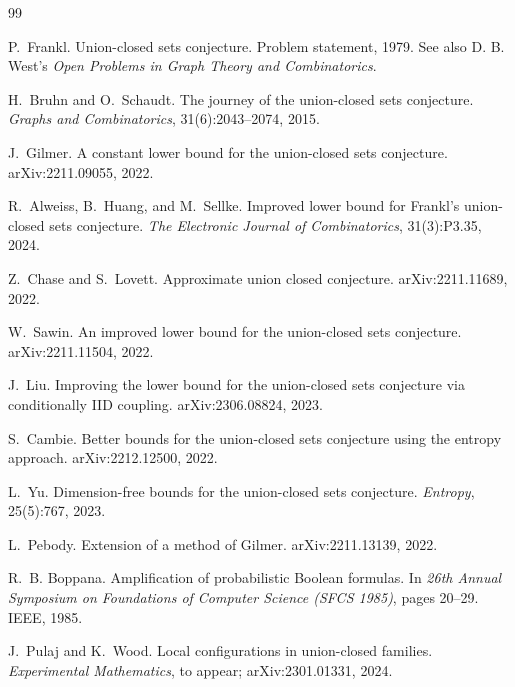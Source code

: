 \begin{thebibliography}{99}

P.~Frankl.
\newblock Union-closed sets conjecture.
\newblock Problem statement, 1979. See also D. B. West's \emph{Open Problems in Graph Theory and Combinatorics}.

H.~Bruhn and O.~Schaudt.
\newblock The journey of the union-closed sets conjecture.
\newblock \emph{Graphs and Combinatorics}, 31(6):2043--2074, 2015.

J.~Gilmer.
\newblock A constant lower bound for the union-closed sets conjecture.
\newblock arXiv:2211.09055, 2022.

R.~Alweiss, B.~Huang, and M.~Sellke.
\newblock Improved lower bound for Frankl's union-closed sets conjecture.
\newblock \emph{The Electronic Journal of Combinatorics}, 31(3):P3.35, 2024.

Z.~Chase and S.~Lovett.
\newblock Approximate union closed conjecture.
\newblock arXiv:2211.11689, 2022.

W.~Sawin.
\newblock An improved lower bound for the union-closed sets conjecture.
\newblock arXiv:2211.11504, 2022.

J.~Liu.
\newblock Improving the lower bound for the union-closed sets conjecture via conditionally {IID} coupling.
\newblock arXiv:2306.08824, 2023.

S.~Cambie.
\newblock Better bounds for the union-closed sets conjecture using the entropy approach.
\newblock arXiv:2212.12500, 2022.

L.~Yu.
\newblock Dimension-free bounds for the union-closed sets conjecture.
\newblock \emph{Entropy}, 25(5):767, 2023.


L.~Pebody.
\newblock Extension of a method of Gilmer.
\newblock arXiv:2211.13139, 2022.

R.~B. Boppana.
\newblock Amplification of probabilistic Boolean formulas.
\newblock In \emph{26th Annual Symposium on Foundations of Computer Science (SFCS 1985)}, pages 20--29. IEEE, 1985.

J.~Pulaj and K.~Wood.
\newblock Local configurations in union-closed families.
\newblock \emph{Experimental Mathematics}, to appear; arXiv:2301.01331, 2024.

\end{thebibliography}



